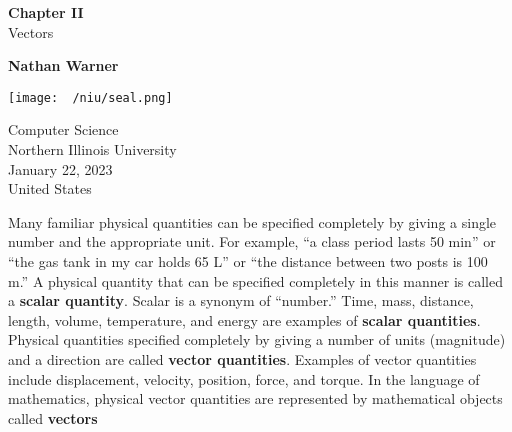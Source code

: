 \documentclass{report}
\title{\Huge{}}
\author{\huge{Nathan Warner}}
\date{\huge{}}
\begin{document}
        \begin{titlepage}
       \begin{center}
           \vspace*{1cm}
    
           \textbf{Chapter II} \\ 
            Vectors
    
           \vspace{0.5cm}
            
                
           \vspace{1.5cm}
    
           \textbf{Nathan Warner}
    
           \vfill
                
                
           \vspace{0.8cm}
         
           \texttt{[image: ~/niu/seal.png]}
                
           Computer Science \\
           Northern Illinois University\\
           January 22, 2023 \\
           United States\\
           
                
       \end{center}
    \end{titlepage}
    \tableofcontents
    \pagebreak 
    \bigbreak \noindent 
    Many familiar physical quantities can be specified completely by giving a single number and the appropriate unit. For example, “a class period lasts 50 min” or “the gas tank in my car holds 65 L” or “the distance between two posts is 100 m.” A physical quantity that can be specified completely in this manner is called a \textbf{scalar quantity}. Scalar is a synonym of “number.” Time, mass, distance, length, volume, temperature, and energy are examples of \textbf{scalar quantities}.
    \bigbreak \noindent 
    Physical quantities specified completely by giving a number of units (magnitude) and a direction are called \textbf{vector quantities}. Examples of vector quantities include displacement, velocity, position, force, and torque.
    \bigbreak \noindent 
    In the language of mathematics, physical vector quantities are represented by mathematical objects called \textbf{vectors}
\end{document}
